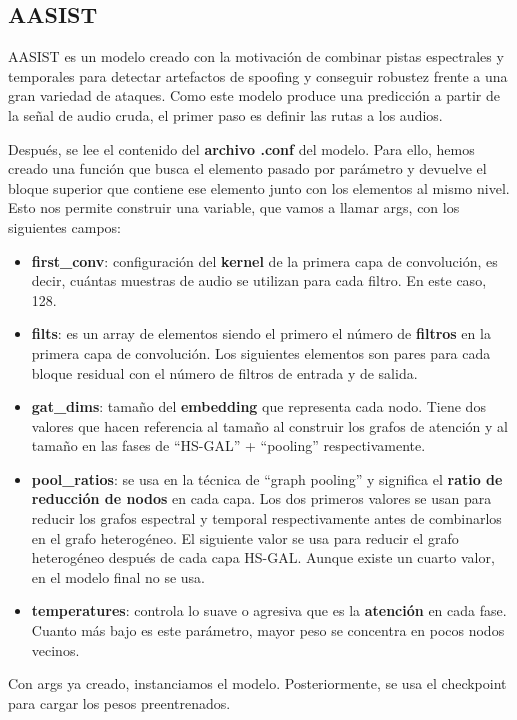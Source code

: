 \subsection{AASIST}
AASIST es un modelo creado con la motivación de combinar pistas espectrales y temporales para detectar artefactos de spoofing y conseguir robustez frente a una gran variedad de ataques.
Como este modelo produce una predicción a partir de la señal de audio cruda, el primer paso es definir las rutas a los audios. 

Después, se lee el contenido del \textbf{archivo .conf} del modelo. Para ello, hemos creado una función que busca el elemento pasado por parámetro y devuelve el bloque superior que contiene ese elemento junto con los elementos al mismo nivel. Esto nos permite construir una variable, que vamos a llamar args, con los siguientes campos:
\begin{itemize}
    \item \textbf{first\_conv}: configuración del \textbf{kernel} de la primera capa de convolución, es decir, cuántas muestras de audio se utilizan para cada filtro. En este caso, 128.
    \item \textbf{filts}: es un array de elementos siendo el primero el número de \textbf{filtros} en la primera capa de convolución. Los siguientes elementos son pares para cada bloque residual con el número de filtros de entrada y de salida.
    \item \textbf{gat\_dims}: tamaño del \textbf{embedding} que representa cada nodo. Tiene dos valores que hacen referencia al tamaño al construir los grafos de atención y al tamaño en las fases de ``HS-GAL'' + ``pooling'' respectivamente.
    \item \textbf{pool\_ratios}: se usa en la técnica de ``graph pooling'' y significa el \textbf{ratio de reducción de nodos} en cada capa. Los dos primeros valores se usan para reducir los grafos espectral y temporal respectivamente antes de combinarlos en el grafo heterogéneo. El siguiente valor se usa para reducir el grafo heterogéneo después de cada capa HS-GAL. Aunque existe un cuarto valor, en el modelo final no se usa.
    \item \textbf{temperatures}: controla lo suave o agresiva que es la \textbf{atención} en cada fase. Cuanto más bajo es este parámetro, mayor peso se concentra en pocos nodos vecinos.
\end{itemize}
Con args ya creado, instanciamos el modelo. Posteriormente, se usa el checkpoint para cargar los pesos preentrenados. 

